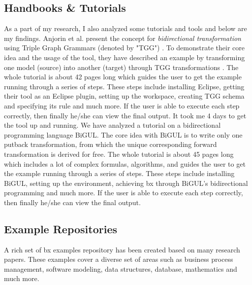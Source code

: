 \subsection{Handbooks \& Tutorials}\label{subsec:handbook}
As a part of my research, I also analyzed some tutorials and tools and below are my findings.
\newline\newline Anjorin et al.\cite{emoflon-part4} present the concept for \textit{bidirectional transformation} using Triple Graph Grammars (denoted by "TGG") \cite{tgg}. To demonstrate their core idea and the usage of the tool, they have described an example by transforming one model (source) into another (target) through TGG transformations \cite{tgg}\cite{bx-tgg}. The whole tutorial is about 42 pages long which guides the user to get the example running through a series of steps. These steps include installing \ac{Eclipse}, getting their tool as an Eclipse plugin, setting up the workspace, creating TGG schema and specifying its rule and much more. If the user is able to execute each step correctly, then finally he/she can view the final output. It took me 4 days to get the tool up and running.
\newline\newline We have analyzed a tutorial\cite{bigul-tutorial} on a bidirectional programming language BiGUL\cite{bigul}. The core idea with BiGUL is to write only one putback transformation, from which the unique corresponding forward transformation is derived for free. The whole tutorial is about 45 pages long which includes a lot of complex formulas, algorithms, and guides the user to get the example running through a series of steps. These steps include installing BiGUL, setting up the environment, achieving bx through BiGUL's bidirectional programming and much more. If the user is able to execute each step correctly, then finally he/she can view the final output. 

\subsection{Example Repositories}\label{subsec:examplerep}
A rich set of bx examples repository \cite{bx-examples} has been created based on many research papers. These examples cover a diverse set of areas such as business process management, software modeling, data structures, database, mathematics and much more.

